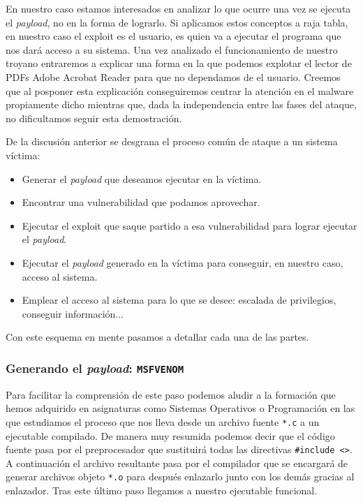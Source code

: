 \documentclass[12pt]{article}
\newcommand{\newpar} {
    \vskip 1cm
}
\begin{document}
                \newpar

                En nuestro caso estamos interesados en analizar lo que ocurre una vez se ejecuta el \textit{payload}, no en la forma de lograrlo. Si aplicamos estos conceptos a raja tabla, en nuestro caso el exploit es el usuario, es quien va a ejecutar el programa que nos dará acceso a su sistema. Una vez analizado el funcionamiento de nuestro troyano entraremos a explicar una forma en la que podemos explotar el lector de PDFs Adobe Acrobat Reader para que no dependamos de el usuario. Creemos que al posponer esta explicación conseguiremos centrar la atención en el malware propiamente dicho mientras que, dada la independencia entre las fases del ataque, no dificultamos seguir esta demostración.

                \newpar

                De la discusión anterior se desgrana el proceso común de ataque a un sistema víctima:

                \begin{itemize}
                    \item Generar el \textit{payload} que deseamos ejecutar en la víctima.
                    \item Encontrar una vulnerabilidad que podamos aprovechar.
                    \item Ejecutar el exploit que saque partido a esa vulnerabilidad para lograr ejecutar el \textit{payload}.
                    \item Ejecutar el \textit{payload} generado en la víctima para conseguir, en nuestro caso, acceso al sistema.
                    \item Emplear el acceso al sistema para lo que se desee: escalada de privilegios, conseguir información...
                \end{itemize}


                Con este esquema en mente pasamos a detallar cada una de las partes.

            \subsubsection{Generando el \textit{payload}: \texttt{MSFVENOM}}
                Para facilitar la comprensión de este paso podemos aludir a la formación que hemos adquirido en asignaturas como Sistemas Operativos o Programación en las que estudiamos el proceso que nos lleva desde un archivo fuente \texttt{*.c} a un ejecutable compilado. De manera muy resumida podemos decir que el código fuente pasa por el preprocesador que sustituirá todas las directivas \texttt{#include <>}. A continuación el archivo resultante pasa por el compilador que se encargará de generar archivos objeto \texttt{*.o} para después enlazarlo junto con los demás gracias al enlazador. Tras este último paso llegamos a nuestro ejecutable funcional.
\end{document}
